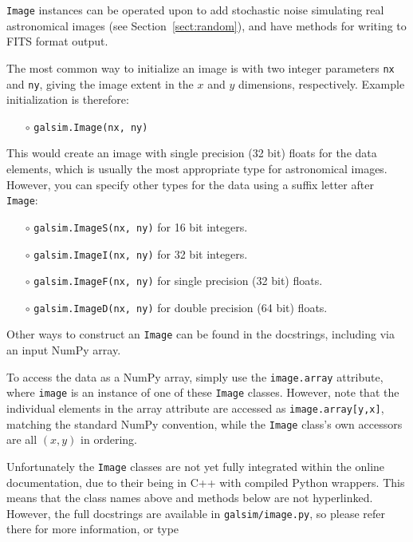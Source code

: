 \documentclass[preprint,11pt]{../../devel/modules/aastex}
\begin{document}
\texttt{Image} instances can be operated upon to add stochastic noise
simulating real astronomical images (see Section~\ref{sect:random}),
and have methods for writing to FITS format output.

The most common way to initialize an
image is with two integer parameters \texttt{nx} and \texttt{ny},
giving the image extent in the $x$ and $y$ dimensions, respectively.
Example initialization is therefore:
\begin{itemize}
\item[$\circ$] \texttt{galsim.Image(nx, ny)}
\end{itemize}
This would create an image with single precision (32 bit) floats for the data elements, which
is usually the most appropriate type for astronomical images.  However, you can specify
other types for the data using a suffix letter after \texttt{Image}:
\begin{itemize}
\item[$\circ$] \texttt{galsim.ImageS(nx, ny)} {for 16 bit integers.}

\item[$\circ$] \texttt{galsim.ImageI(nx, ny)} {for 32 bit integers.}

\item[$\circ$] \texttt{galsim.ImageF(nx, ny)} {for single precision (32 bit) floats.}

\item[$\circ$] \texttt{galsim.ImageD(nx, ny)} {for double precision (64 bit) floats.}
\end{itemize}
Other ways to construct an \texttt{Image} can be found in the
docstrings, including via an input NumPy array.

To access the data as a NumPy array, simply use the \texttt{image.array}
attribute, where \texttt{image} is an instance of one of these
\texttt{Image} classes.  However, note that the individual elements in
the array attribute are accessed as \texttt{image.array[y,x]}, matching
the standard NumPy convention, while the \texttt{Image} class's own
accessors are all $(x,y)$ in ordering.

Unfortunately the \texttt{Image} classes are not yet fully integrated
within the online documentation, due to their being in C++ with
compiled Python wrappers.  This means that the class names above and
methods below are not hyperlinked.  However, the full docstrings are
available in \texttt{galsim/image.py}, so please refer there for more
information, or type
\end{document}
